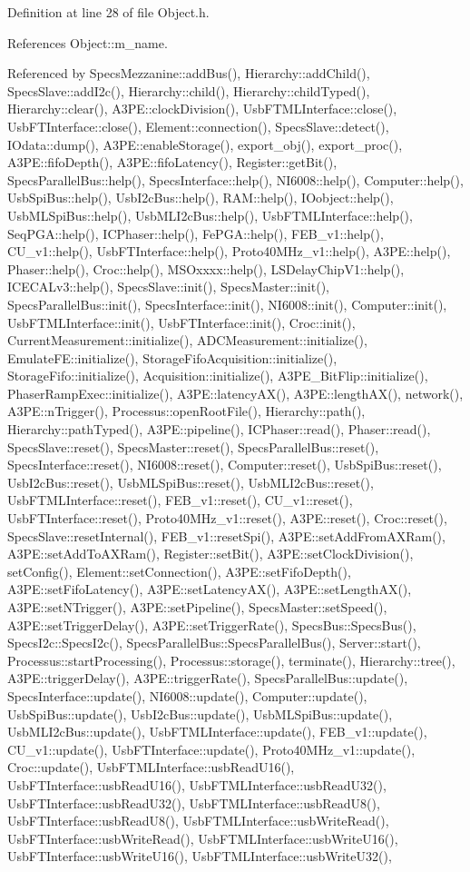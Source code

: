 Definition at line 28 of file Object.h.

References Object::m\_\-name.

Referenced by SpecsMezzanine::addBus(), Hierarchy::addChild(), SpecsSlave::addI2c(), Hierarchy::child(), Hierarchy::childTyped(), Hierarchy::clear(), A3PE::clockDivision(), UsbFTMLInterface::close(), UsbFTInterface::close(), Element::connection(), SpecsSlave::detect(), IOdata::dump(), A3PE::enableStorage(), export\_\-obj(), export\_\-proc(), A3PE::fifoDepth(), A3PE::fifoLatency(), Register::getBit(), SpecsParallelBus::help(), SpecsInterface::help(), NI6008::help(), Computer::help(), UsbSpiBus::help(), UsbI2cBus::help(), RAM::help(), IOobject::help(), UsbMLSpiBus::help(), UsbMLI2cBus::help(), UsbFTMLInterface::help(), SeqPGA::help(), ICPhaser::help(), FePGA::help(), FEB\_\-v1::help(), CU\_\-v1::help(), UsbFTInterface::help(), Proto40MHz\_\-v1::help(), A3PE::help(), Phaser::help(), Croc::help(), MSOxxxx::help(), LSDelayChipV1::help(), ICECALv3::help(), SpecsSlave::init(), SpecsMaster::init(), SpecsParallelBus::init(), SpecsInterface::init(), NI6008::init(), Computer::init(), UsbFTMLInterface::init(), UsbFTInterface::init(), Croc::init(), CurrentMeasurement::initialize(), ADCMeasurement::initialize(), EmulateFE::initialize(), StorageFifoAcquisition::initialize(), StorageFifo::initialize(), Acquisition::initialize(), A3PE\_\-BitFlip::initialize(), PhaserRampExec::initialize(), A3PE::latencyAX(), A3PE::lengthAX(), network(), A3PE::nTrigger(), Processus::openRootFile(), Hierarchy::path(), Hierarchy::pathTyped(), A3PE::pipeline(), ICPhaser::read(), Phaser::read(), SpecsSlave::reset(), SpecsMaster::reset(), SpecsParallelBus::reset(), SpecsInterface::reset(), NI6008::reset(), Computer::reset(), UsbSpiBus::reset(), UsbI2cBus::reset(), UsbMLSpiBus::reset(), UsbMLI2cBus::reset(), UsbFTMLInterface::reset(), FEB\_\-v1::reset(), CU\_\-v1::reset(), UsbFTInterface::reset(), Proto40MHz\_\-v1::reset(), A3PE::reset(), Croc::reset(), SpecsSlave::resetInternal(), FEB\_\-v1::resetSpi(), A3PE::setAddFromAXRam(), A3PE::setAddToAXRam(), Register::setBit(), A3PE::setClockDivision(), setConfig(), Element::setConnection(), A3PE::setFifoDepth(), A3PE::setFifoLatency(), A3PE::setLatencyAX(), A3PE::setLengthAX(), A3PE::setNTrigger(), A3PE::setPipeline(), SpecsMaster::setSpeed(), A3PE::setTriggerDelay(), A3PE::setTriggerRate(), SpecsBus::SpecsBus(), SpecsI2c::SpecsI2c(), SpecsParallelBus::SpecsParallelBus(), Server::start(), Processus::startProcessing(), Processus::storage(), terminate(), Hierarchy::tree(), A3PE::triggerDelay(), A3PE::triggerRate(), SpecsParallelBus::update(), SpecsInterface::update(), NI6008::update(), Computer::update(), UsbSpiBus::update(), UsbI2cBus::update(), UsbMLSpiBus::update(), UsbMLI2cBus::update(), UsbFTMLInterface::update(), FEB\_\-v1::update(), CU\_\-v1::update(), UsbFTInterface::update(), Proto40MHz\_\-v1::update(), Croc::update(), UsbFTMLInterface::usbReadU16(), UsbFTInterface::usbReadU16(), UsbFTMLInterface::usbReadU32(), UsbFTInterface::usbReadU32(), UsbFTMLInterface::usbReadU8(), UsbFTInterface::usbReadU8(), UsbFTMLInterface::usbWriteRead(), UsbFTInterface::usbWriteRead(), UsbFTMLInterface::usbWriteU16(), UsbFTInterface::usbWriteU16(), UsbFTMLInterface::usbWriteU32(), 